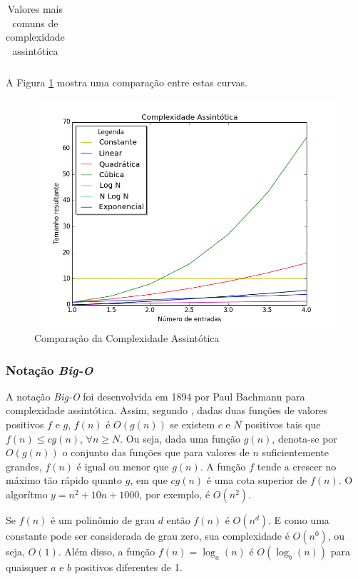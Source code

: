 {\begin{table}[ht]
\begin{tabularx}{0.9\textwidth}{cX}
		\bottomrule
	\end{tabularx}
	\caption{ Valores mais comuns de complexidade assintótica}
	\label{complexidadeAlgoritmica}
\end{table}

	A Figura \ref{compalg} mostra uma comparação entre estas curvas. 

	\begin{figure}[ht]
	\centering
		\includegraphics[keepaspectratio=true,scale=0.4]{figuras/compalg.png}
	\caption{Comparação da Complexidade Assintótica}
	\label{compalg}
	\end{figure}

	\subsubsection{Notação \textit{Big-O}}

	
	A notação \textit{Big-O} foi desenvolvida em 1894 por Paul Bachmann para complexidade assintótica. Assim, segundo \cite{complexidade}, dadas duas funções de valores positivos $f$ e $g$, $f(n)$ é $O(g(n))$ se existem $c$ e $N$ positivos tais que $f(n) \leq cg(n)$, $\forall n \geq N$. Ou seja, dada uma função $g(n)$, denota-se por $O(g(n))$ o conjunto das funções que para valores de $n$ suficientemente grandes, $f(n)$ é igual ou menor que $g(n)$. A função $f$ tende a crescer no máximo tão rápido quanto $g$, em que $cg(n)$ é uma cota superior de $f(n)$. O algorítmo $y = n^{2} +10 n + 1000$, por exemplo, é $O(n^2)$. 

	Se $f(n)$ é um polinômio de grau $d$  então $f(n)$ é $O(n^d)$. E como uma constante pode ser considerada de grau zero, sua complexidade é $O(n^0)$, ou seja, $O(1)$. Além disso, a função $f(n) = \log _a \left( n \right)$ é $O(\log _b \left( n \right))$ para quaisquer $a$ e $b$ positivos diferentes de 1. 

}
